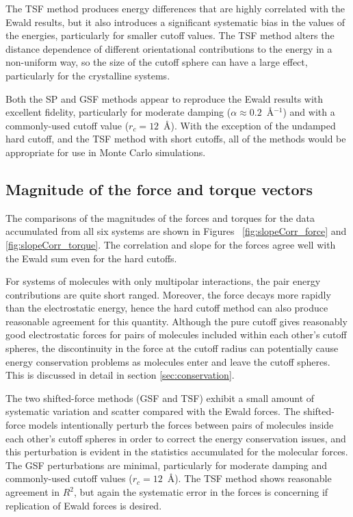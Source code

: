 The TSF method produces energy differences that are highly correlated
with the Ewald results, but it also introduces a significant
systematic bias in the values of the energies, particularly for
smaller cutoff values. The TSF method alters the distance dependence
of different orientational contributions to the energy in a
non-uniform way, so the size of the cutoff sphere can have a large
effect, particularly for the crystalline systems.

Both the SP and GSF methods appear to reproduce the Ewald results with
excellent fidelity, particularly for moderate damping ($\alpha \approx
0.2$~\AA$^{-1}$) and with a commonly-used cutoff value ($r_c =
12$~\AA).  With the exception of the undamped hard cutoff, and the TSF
method with short cutoffs, all of the methods would be appropriate for
use in Monte Carlo simulations.
\subsection{Magnitude of the force and torque vectors}

The comparisons of the magnitudes of the forces and torques for the
data accumulated from all six systems are shown in Figures
~\ref{fig:slopeCorr_force} and \ref{fig:slopeCorr_torque}. The
correlation and slope for the forces agree well with the Ewald sum
even for the hard cutoffs.

For systems of molecules with only multipolar interactions, the pair
energy contributions are quite short ranged.  Moreover, the force
decays more rapidly than the electrostatic energy, hence the hard
cutoff method can also produce reasonable agreement for this quantity.
Although the pure cutoff gives reasonably good electrostatic forces
for pairs of molecules included within each other's cutoff spheres,
the discontinuity in the force at the cutoff radius can potentially
cause energy conservation problems as molecules enter and leave the
cutoff spheres.  This is discussed in detail in section
\ref{sec:conservation}.

The two shifted-force methods (GSF and TSF) exhibit a small amount of
systematic variation and scatter compared with the Ewald forces.  The
shifted-force models intentionally perturb the forces between pairs of
molecules inside each other's cutoff spheres in order to correct the
energy conservation issues, and this perturbation is evident in the
statistics accumulated for the molecular forces.  The GSF
perturbations are minimal, particularly for moderate damping and
commonly-used cutoff values ($r_c = 12$~\AA).  The TSF method shows
reasonable agreement in $R^2$, but again the systematic error in the
forces is concerning if replication of Ewald forces is desired.


